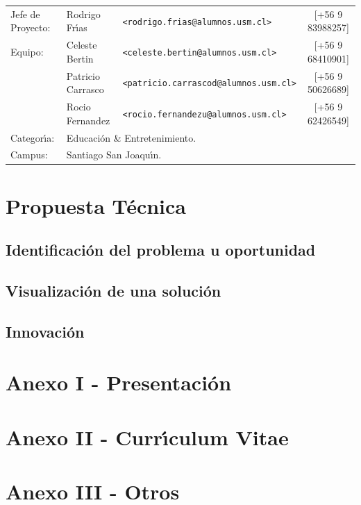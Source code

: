 \documentclass[letterpaper,11pt]{report} %
\numberwithin{equation}{section} %
\numberwithin{figure}{section} %
\numberwithin{table}{section} %
\begin{document}
\begin{titlepage}
\vfill
\begin{flushleft} %
\begin{table}[hb]
  \begin{tabular}{lllc}
    Jefe de Proyecto: & Rodrigo Fr\'{\i}as & \texttt{\small <rodrigo.frias@alumnos.usm.cl>} & [+56 9 83988257] \\
    Equipo: & Celeste Bertin & \texttt{\small <celeste.bertin@alumnos.usm.cl>} &[+56 9 68410901]\\
    & Patricio Carrasco &\texttt{\small <patricio.carrascod@alumnos.usm.cl>} &[+56 9 50626689]\\
    & Rocio Fernandez &\texttt{\small <rocio.fernandezu@alumnos.usm.cl>} &[+56 9 62426549]\\
    Categor\'{\i}a: & \multicolumn{3}{l}{Educaci\'on \& Entretenimiento.}\\
    Campus: & \multicolumn{3}{l}{Santiago San Joaqu\'{\i}n.}
  \end{tabular}
\end{table}
\end{flushleft}
\end{titlepage}


\setcounter{page}{1} %

\tableofcontents %
\newpage

\chapter*{Propuesta T\'ecnica}
\newpage
\section{Identificaci\'on del problema u oportunidad}

\newpage
\section{Visualizaci\'on de una soluci\'on}

\newpage
\section{Innovaci\'on}

\newpage
\chapter*{Anexo I - Presentaci\'on} %

\newpage
\chapter*{Anexo II - Curr\'{\i}culum Vitae} %




\newpage
\chapter*{Anexo III - Otros} %
\end{document}
